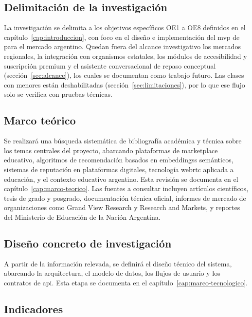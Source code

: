 \subsection{Delimitación de la investigación}

La investigación se delimita a los objetivos específicos OE1 a OE8
definidos en el capítulo~\ref{cap:introduccion}, con foco en el diseño e
implementación del \gls{mvp} de \sistema{} para el mercado argentino.
Quedan fuera del alcance investigativo los mercados regionales, la
integración con organismos estatales, los módulos de accesibilidad y
suscripción premium y el asistente conversacional de repaso conceptual
(sección~\ref{sec:alcance}), los cuales se documentan como trabajo
futuro. Las clases con menores están deshabilitadas
(sección~\ref{sec:limitaciones}), por lo que ese flujo solo se verifica
con pruebas técnicas.

\subsection{Marco teórico}

Se realizará una búsqueda sistemática de bibliografía académica y
técnica sobre los temas centrales del proyecto, abarcando plataformas de
\gls{marketplace} educativo, algoritmos de recomendación basados en
\glspl{embeddings} semánticos, sistemas de reputación en plataformas
digitales, tecnología \gls{webrtc} aplicada a educación, y el contexto
educativo argentino. Esta revisión se documenta en el
capítulo~\ref{cap:marco-teorico}. Las fuentes a consultar incluyen
artículos científicos, tesis de grado y posgrado, documentación técnica
oficial, informes de mercado de organizaciones como Grand View Research
y Research and Markets, y reportes del Ministerio de Educación de la
Nación Argentina.

\subsection{Diseño concreto de investigación}

A partir de la información relevada, se definirá el diseño técnico del
sistema, abarcando la arquitectura, el modelo de datos, los flujos de
usuario y los contratos de \gls{api}. Esta etapa se documenta en el
capítulo~\ref{cap:marco-tecnologico}.

\subsection{Indicadores}

